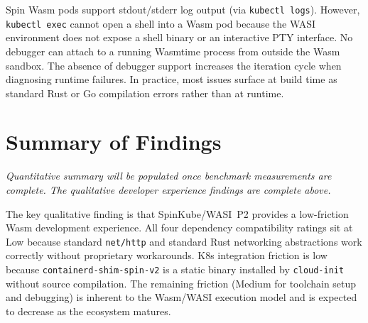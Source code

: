 \begin{sloppypar}
Spin \acs{Wasm} pods support stdout/stderr log output (via \texttt{kubectl logs}). However, \texttt{kubectl exec} cannot open a shell into a \acs{Wasm} pod because the \acs{WASI} environment does not expose a shell binary or an interactive \acs{PTY} interface. No debugger can attach to a running Wasmtime process from outside the \acs{Wasm} sandbox. The absence of debugger support increases the iteration cycle when diagnosing runtime failures. In practice, most issues surface at build time as standard Rust or Go compilation errors rather than at runtime.
\end{sloppypar}

\section{Summary of Findings}
\label{sec:eval_summary}

\textit{Quantitative summary will be populated once benchmark measurements are complete. The qualitative developer experience findings are complete above.}

\begin{sloppypar}
The key qualitative finding is that SpinKube/\acs{WASI}~P2 provides a low-friction Wasm development experience. All four dependency compatibility ratings sit at Low because standard \texttt{net/http} and standard Rust networking abstractions work correctly without proprietary workarounds. K8s integration friction is low because \texttt{containerd-shim-spin-v2} is a static binary installed by \texttt{cloud-init} without source compilation. The remaining friction (Medium for toolchain setup and debugging) is inherent to the \acs{Wasm}/\acs{WASI} execution model and is expected to decrease as the ecosystem matures.
\end{sloppypar}
